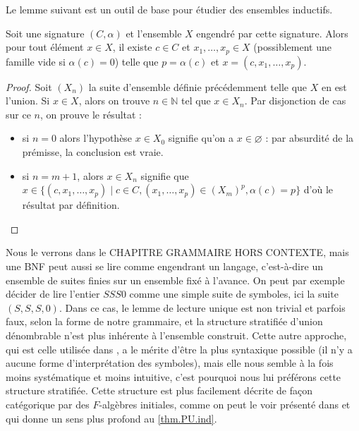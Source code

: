 Le lemme suivant est un outil de base pour étudier des ensembles inductifs.

\begin{lemma}
  Soit une signature $(C,\alpha)$ et l'ensemble $X$ engendré par cette
  signature. Alors pour tout élément $x \in X$, il existe $c\in C$ et
  $x_1,\ldots,x_p \in X$ (possiblement une famille vide si $\alpha(c) = 0$)
  telle que $p = \alpha(c)$ et $x = (c,x_1,\ldots,x_p)$.
\end{lemma}

\begin{proof}
  Soit $(X_n)$ la suite d'ensemble définie précédemment telle que $X$ en est
  l'union. Si $x\in X$, alors on trouve $n \in \mathbb N$ tel que $x\in X_n$.
  Par disjonction de cas sur ce $n$, on prouve le résultat :
  \begin{itemize}
  \item si $n = 0$ alors l'hypothèse $x \in X_0$ signifie qu'on a
    $x\in \varnothing$ : par absurdité de la prémisse, la conclusion est vraie.
  \item si $n = m+1$, alors $x\in X_n$ signifie que
    $x \in \{(c,x_1,\ldots,x_p)\mid c\in C, (x_1,\ldots,x_p)\in(X_m)^p,
    \alpha(c) = p\}$ d'où le résultat par définition.
  \end{itemize}
\end{proof}

\begin{remark}
  Nous le verrons dans le CHAPITRE GRAMMAIRE HORS CONTEXTE, mais une BNF peut
  aussi se lire comme engendrant un langage, c'est-à-dire un ensemble de suites
  finies sur un ensemble fixé à l'avance. On peut par exemple décider de lire
  l'entier $SSS0$ comme une simple suite de symboles, ici la suite $(S,S,S,0)$.
  Dans ce cas, le lemme de lecture unique est non trivial et parfois faux,
  selon la forme de notre grammaire, et la structure stratifiée d'union
  dénombrable n'est plus inhérente à l'ensemble construit. Cette autre approche,
  qui est celle utilisée dans \cite{cori2003logique}, a le mérite d'être la plus
  syntaxique possible (il n'y a aucune forme d'interprétation des symboles),
  mais elle nous semble à la fois moins systématique et moins intuitive, c'est
  pourquoi nous lui préférons cette structure stratifiée. Cette structure est
  plus facilement décrite de façon catégorique par des $F$-algèbres initiales,
  comme on peut le voir présenté dans \cite{JacobsCLTT} et qui donne un sens
  plus profond au \cref{thm.PU.ind}.
\end{remark}

